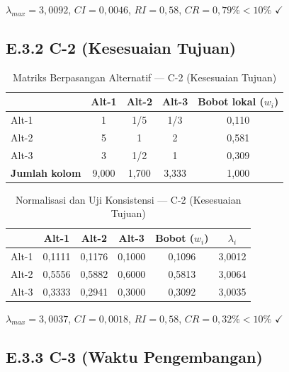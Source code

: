 $\lambda_{max} = 3{,}0092$, $CI = 0{,}0046$, $RI = 0{,}58$, $CR = 0{,}79\% < 10\%$ $\checkmark$

\subsection*{E.3.2 C-2 (Kesesuaian Tujuan)}

\begin{table}[H]
  \caption{Matriks Berpasangan Alternatif --- C-2 (Kesesuaian Tujuan)}
  \label{tab:matriks-c2}
  \centering
  \begin{tabular}{| l | c | c | c | c |}
    \hline
    & \textbf{Alt-1} & \textbf{Alt-2} & \textbf{Alt-3} & \textbf{Bobot lokal ($w_i$)} \\
    \hline
    Alt-1 & 1 & 1/5 & 1/3 & 0,110 \\
    \hline
    Alt-2 & 5 & 1   & 2   & 0,581 \\
    \hline
    Alt-3 & 3 & 1/2 & 1   & 0,309 \\
    \hline
    \textbf{Jumlah kolom} & 9,000 & 1,700 & 3,333 & 1,000 \\
    \hline
  \end{tabular}
\end{table}

\begin{table}[H]
  \caption{Normalisasi dan Uji Konsistensi --- C-2 (Kesesuaian Tujuan)}
  \label{tab:norm-c2}
  \centering
  \begin{tabular}{| l | c | c | c | c | c |}
    \hline
    & \textbf{Alt-1} & \textbf{Alt-2} & \textbf{Alt-3} & \textbf{Bobot ($w_i$)} & \textbf{$\lambda_i$} \\
    \hline
    Alt-1 & 0,1111 & 0,1176 & 0,1000 & 0,1096 & 3,0012 \\
    \hline
    Alt-2 & 0,5556 & 0,5882 & 0,6000 & 0,5813 & 3,0064 \\
    \hline
    Alt-3 & 0,3333 & 0,2941 & 0,3000 & 0,3092 & 3,0035 \\
    \hline
  \end{tabular}
\end{table}

$\lambda_{max} = 3{,}0037$, $CI = 0{,}0018$, $RI = 0{,}58$, $CR = 0{,}32\% < 10\%$ $\checkmark$

\subsection*{E.3.3 C-3 (Waktu Pengembangan)}

